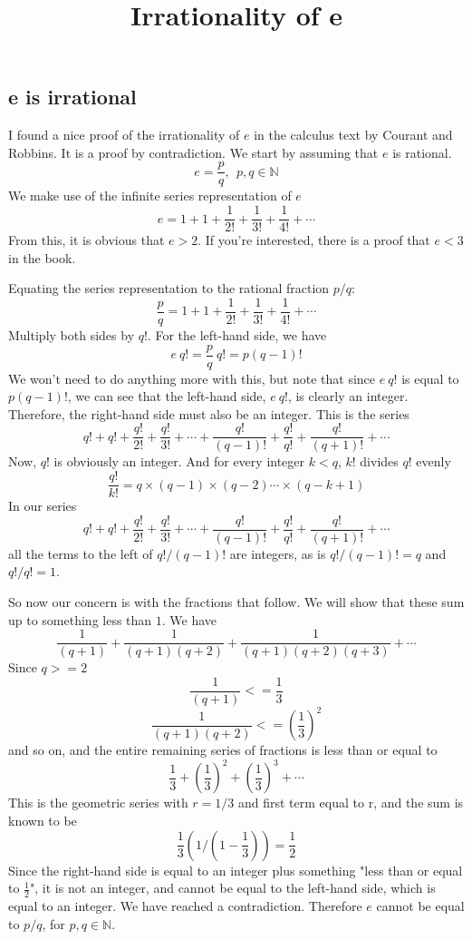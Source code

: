 \documentclass[11pt, oneside]{article}
\title{Irrationality of e}
\date{}
\begin{document}
\maketitle
\Large

\subsection*{e is irrational}

I found a nice proof of the irrationality of $e$ in the calculus text by Courant and Robbins.  It is a proof by contradiction.  We start by assuming that $e$ is rational.
\[ e = \frac{p}{q}, \ \  p,q \in \mathbb{N} \]
We make use of the infinite series representation of $e$
\[ e = 1 + 1 + \frac{1}{2!}  + \frac{1}{3!} + \frac{1}{4!} + \cdots \]
From this, it is obvious that $e > 2$.  If you're interested, there is a proof that $e < 3$ in the book.  

Equating the series representation to the rational fraction $p/q$:
\[ \frac{p}{q} = 1 + 1 + \frac{1}{2!}  + \frac{1}{3!} + \frac{1}{4!} + \cdots \]
Multiply both sides by $q!$.  For the left-hand side, we have 
\[ e \ q! = \frac{p}{q} \ q! = p (q-1)! \]
We won't need to do anything more with this, but note that since $e\ q!$ is equal to $p (q-1)!$, we can see that the left-hand side, $e\ q!$, is clearly an integer.
Therefore, the right-hand side must also be an integer.  This is the series
\[ q! + q! + \frac{q!}{2!}  + \frac{q!}{3!}  + \cdots + \frac{q!}{(q-1)!} + \frac{q!}{q!} + \frac{q!}{(q+1)!} + \cdots \]
Now, 
$q!$ is obviously an integer. And for every integer $k < q$, $k!$ divides $q!$ evenly 
\[ \frac{q!}{k!} = q \times (q-1) \times (q-2) \cdots \times (q-k+1) \]
In our series
\[ q! + q! + \frac{q!}{2!}  + \frac{q!}{3!}  + \cdots + \frac{q!}{(q-1)!} + \frac{q!}{q!} + \frac{q!}{(q+1)!} + \cdots \]
all the terms to the left of $q!/(q-1)!$ are integers, as is $q!/(q-1)! = q$ and $q!/q! = 1$.  
\vspace{2 mm}

So now our concern is with the fractions that follow.  We will show that these sum up to something less than $1$.  We have
\[ \frac{1}{(q+1)} + \frac{1}{(q+1)(q+2)} + \frac{1}{(q+1)(q+2)(q+3)} + \cdots \]
Since $q >= 2$
\[ \frac{1}{(q+1)} <= \frac{1}{3} \]
\[ \frac{1}{(q+1)(q+2)} <= (\frac{1}{3})^2 \]
and so on, and the entire remaining series of fractions is less than or equal to
\[ \frac{1}{3} + (\frac{1}{3})^2 + (\frac{1}{3})^3 + \cdots \]
This is the geometric series with $r = 1/3$ and first term equal to r, and the sum is known to be
\[ \frac{1}{3} ( 1 / (1-\frac{1}{3}) ) = \frac{1}{2} \]
Since the right-hand side is equal to an integer plus something "less than or equal to $\frac{1}{2}$", it is not an integer, and cannot be equal to the left-hand side, which is equal to an integer.  We have reached a contradiction.  Therefore $e$ cannot be equal to $p/q$, for $p,q \in \mathbb{N}$.
\end{document}
